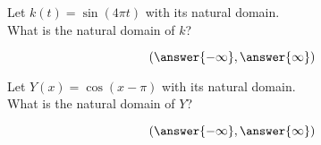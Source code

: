 \documentclass{ximera}
\begin{document}
\begin{exercise}
\begin{question}


Let $k(t) = \sin(4\pi t)$ with its natural domain. \\

What is the natural domain of $k$?

\[
\left( \answer{-\infty},  \answer{\infty}  \right)
\]


\end{question}












\begin{question}


Let $Y(x) = \cos(x-\pi)$ with its natural domain. \\

What is the natural domain of $Y$?

\[
\left( \answer{-\infty}, \answer{\infty}  \right)
\]


\end{question}













\end{exercise}
\end{document}
